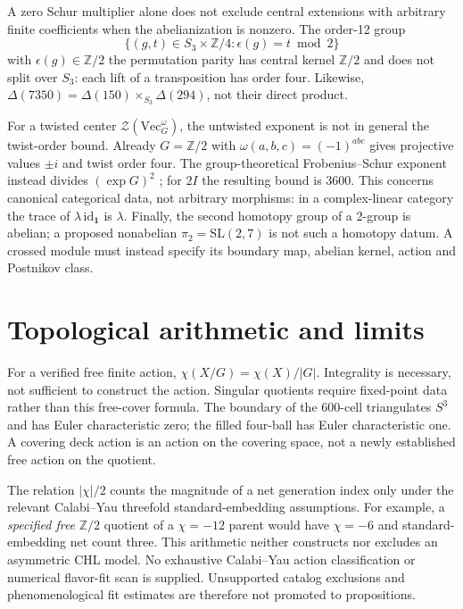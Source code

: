 \documentclass[11pt,a4paper]{amsart}
\newcommand{\Z}{\mathbb Z}
\newcommand{\SL}{\mathrm{SL}}
\begin{document}
A zero Schur multiplier alone does not exclude central extensions with
arbitrary finite coefficients when the abelianization is nonzero. The
order-12 group
\[
\{(g,t)\in S_3\times\Z/4:\epsilon(g)=t\bmod2\}
\]
with $\epsilon(g)\in\Z/2$ the permutation parity has central kernel $\Z/2$
and does not split over $S_3$: each lift of a
transposition has order four. Likewise,
$\Delta(7350)=\Delta(150)\times_{S_3}\Delta(294)$, not their direct product.

For a twisted center $\mathcal Z(\mathrm{Vec}_G^\omega)$, the untwisted
exponent is not in general the twist-order bound. Already $G=\Z/2$ with
$\omega(a,b,c)=(-1)^{abc}$ gives projective values $\pm i$ and twist order
four. The group-theoretical Frobenius--Schur exponent instead divides
$(\exp G)^2$ \cite[Theorem 9.2]{NgSchauenburg2007}; for $2I$ the resulting
bound is 3600. This concerns canonical categorical data, not arbitrary
morphisms: in a complex-linear category the trace of
$\lambda\,\mathrm{id}_{\mathbf1}$ is $\lambda$.
Finally, the second homotopy group of a 2-group is abelian; a proposed
nonabelian $\pi_2=\SL(2,7)$ is not such a homotopy datum. A crossed module
must instead specify its boundary map, abelian kernel, action and
Postnikov class.

\section{Topological arithmetic and limits}
For a verified free finite action,
$\chi(X/G)=\chi(X)/|G|$. Integrality is necessary, not sufficient to
construct the action. Singular quotients require fixed-point data rather
than this free-cover formula. The boundary of the 600-cell triangulates
$S^3$ and has Euler characteristic zero; the filled four-ball has Euler
characteristic one. A covering deck action is an action on the covering
space, not a newly established free action on the quotient.

The relation $|\chi|/2$ counts the magnitude of a net generation index only
under the relevant Calabi--Yau threefold standard-embedding assumptions.
For example, a \emph{specified free} $\Z/2$ quotient of a $\chi=-12$ parent
would have $\chi=-6$ and standard-embedding net count three. This arithmetic
neither constructs nor excludes an asymmetric CHL model. No exhaustive
Calabi--Yau action classification or numerical flavor-fit scan is supplied.
Unsupported catalog exclusions and phenomenological fit estimates are
therefore not promoted to propositions.
\end{document}
